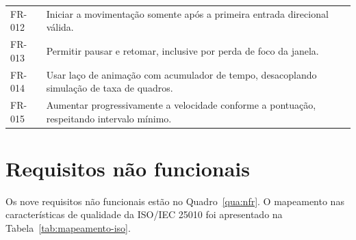 \begin{quadro}[htb]
\begin{tabularx}{\textwidth}{@{}p{1.5cm} X@{}}
		\addlinespace
		FR-012 & Iniciar a movimentação somente após a primeira entrada direcional válida. \\
		\addlinespace
		FR-013 & Permitir pausar e retomar, inclusive por perda de foco da janela. \\
		\addlinespace
		FR-014 & Usar laço de animação com acumulador de tempo, desacoplando simulação de taxa de quadros. \\
		\addlinespace
		FR-015 & Aumentar progressivamente a velocidade conforme a pontuação, respeitando intervalo mínimo. \\
		\bottomrule
	\end{tabularx}
\end{quadro}

\section{Requisitos não funcionais}
\label{sec:esp-nfr}

Os nove requisitos não funcionais estão no Quadro~\ref{qua:nfr}. O mapeamento nas
características de qualidade da ISO/IEC 25010 foi apresentado na
Tabela~\ref{tab:mapeamento-iso}.


